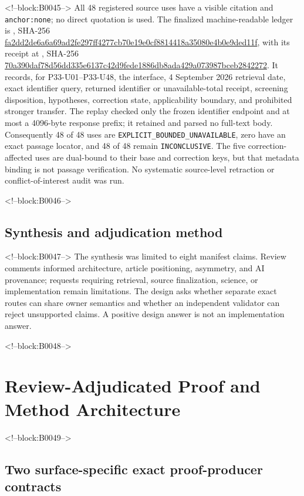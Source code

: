 \documentclass[11pt,a4paper]{article}
\begin{document}
<!--block:B0045-->
All 48 registered source uses have a visible citation and \texttt{anchor:none}; no direct quotation is used. The finalized machine-readable ledger is , SHA-256 \url{fa2dd2de6a6a69ad2fe297ff4277cb70e19e0cf8814418a35080e4b0e9ded11f}, with its receipt at , SHA-256 \url{70a390daf78d56dd335e6137c42d9fede1886db8ada429a073987bceb2842272}. It records, for P33-U01--P33-U48, the interface, 4 September 2026 retrieval date, exact identifier query, returned identifier or unavailable-total receipt, screening disposition, hypotheses, correction state, applicability boundary, and prohibited stronger transfer. The replay checked only the frozen identifier endpoint and at most a 4096-byte response prefix; it retained and parsed no full-text body. Consequently 48 of 48 uses are \texttt{EXPLICIT\_BOUNDED\_UNAVAILABLE}, zero have an exact passage locator, and 48 of 48 remain \texttt{INCONCLUSIVE}. The five correction-affected uses are dual-bound to their base and correction keys, but that metadata binding is not passage verification. No systematic source-level retraction or conflict-of-interest audit was run.

<!--block:B0046-->
\hypertarget{synthesis-and-adjudication-method}{%
\subsection{Synthesis and adjudication method}\label{synthesis-and-adjudication-method}}

<!--block:B0047-->
The synthesis was limited to eight manifest claims. Review comments informed architecture, article positioning, asymmetry, and AI provenance; requests requiring retrieval, source finalization, science, or implementation remain limitations. The design asks whether separate exact routes can share owner semantics and whether an independent validator can reject unsupported claims. A positive design answer is not an implementation answer.

<!--block:B0048-->
\hypertarget{review-adjudicated-proof-and-method-architecture}{%
\section{Review-Adjudicated Proof and Method Architecture}\label{review-adjudicated-proof-and-method-architecture}}

<!--block:B0049-->
\hypertarget{two-surface-specific-exact-proof-producer-contracts}{%
\subsection{Two surface-specific exact proof-producer contracts}\label{two-surface-specific-exact-proof-producer-contracts}}
\end{document}
